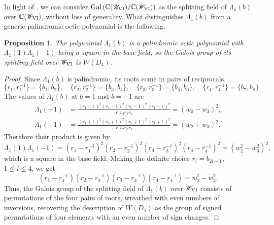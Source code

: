 \documentclass[a4paper,reqno]{amsart}
\numberwithin{equation}{section}
\newcommand{\C}{\mathbb{C}}
\newtheorem{proposition}[theorem]{Proposition}
\numberwithin{equation}{section}
\begin{document}




In light of , we can consider $\operatorname{Gal}\left(\C(\mathscr{U}_{\rm{VI}})/\C(\mathscr{W}_{\rm{VI}})\right)$ as the splitting field of $\Lambda_1(b)$ over $\C(\mathscr{W}_{\rm{VI}})$, without loss of generality.
What distinguishes $\Lambda_1(b)$ from a generic palindromic octic polynomial is the following.
\begin{proposition}
    The polynomial $\Lambda_1(b)$ is a palindromic octic polynomial with $\Lambda_1(1)\Lambda_1(-1)$ being a square in the base field, 
    so the Galois group   of its splitting field over $\mathscr{W}_{\rm{VI}}$ is $W(D_4)$.
\end{proposition}
\begin{proof}
    Since $\Lambda_1(b)$ is palindromic, its roots come in pairs of reciprocals, 
    \begin{equation*}
      \{r_1,r_1^{-1}\}=\{b_1,b_2\},\quad
      \{r_2,r_2^{-1}\}=\{b_3,b_4\},\quad
      \{r_3,r_3^{-1}\}=\{b_5,b_6\},\quad
      \{r_4,r_4^{-1}\}=\{b_7,b_8\}.
    \end{equation*}
    The values of $\Lambda_1(b)$ at $b=1$ and $b=-1$ are
    \begin{equation*}
    \begin{aligned}
        \Lambda_1(+1) &= \frac{ (r_1-1)^2(r_2-1)^2(r_3-1)^2(r_4-1)^2}{r_1r_2r_3r_4}  = (w_2 - w_3)^2,\\
      \Lambda_1(-1) &=  \frac{ (r_1+1)^2(r_2+1)^2(r_3+1)^2(r_4+1)^2}{r_1r_2r_3r_4}  = (w_2 + w_3)^2.
  \end{aligned}
    \end{equation*}
Therefore their product is given by 
    $$\Lambda_1(1) \Lambda_1(-1) = (r_1-r_1^{-1})^2(r_2-r_2^{-1})^2(r_3-r_3^{-1})^2(r_4-r_4^{-1})^2 = (w_2^2-w_3^2)^2,$$
    which is a square in the base field.
    Making the definite choice $r_i=b_{2i-1}$, $1\leq i\leq 4$, we get 
    $$(r_1-r_1^{-1})(r_2-r_2^{-1})(r_3-r_3^{-1})(r_4-r_4^{-1}) = w_2^2-w_3^2.$$ 
    Thus, the Galois group of the splitting field of $\Lambda_1(b)$ over $\mathscr{W}_{\rm{VI}}$ consists of permutations of the four pairs of roots, wreathed with even numbers of inversions, recovering the description of $W(D_4)$ as the group of signed permutations of four elements with an even number of sign changes.
\end{proof}
\end{document}
